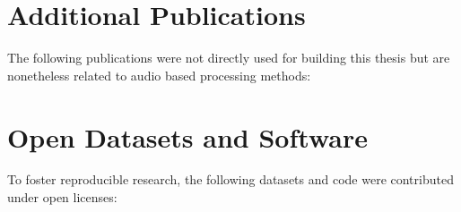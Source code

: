 \section*{Additional Publications}
The following publications were not directly used for building this thesis but are nonetheless related to audio based processing methods:
\begin{refsection}
\nocite{*}
\printbibliography[env=numbered+bold, heading=none,resetnumbers=true, sorting=ynt]
\newrefcontext[sorting=nyt]
\end{refsection}

\section*{Open Datasets and Software}
To foster reproducible research, the following datasets and code were contributed under open licenses:
\begin{refsection}
\nocite{*}
\printbibliography[env=numbered+bold, heading=none,resetnumbers=true, sorting=ynt]
\newrefcontext[sorting=nyt]
\end{refsection}
